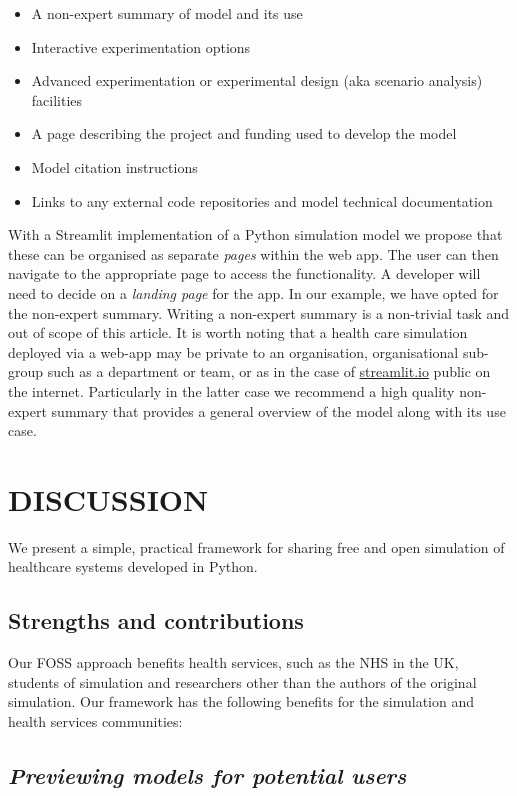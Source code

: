 \documentclass{swpaperproc}
\theoremstyle{sw}
\begin{document}
\begin{itemize}
    \item A non-expert summary of model and its use
    \item Interactive experimentation options
    \item Advanced experimentation or experimental design (aka scenario analysis) facilities
    \item A page describing the project and funding used to develop the model
    \item Model citation instructions
    \item Links to any external code repositories and model technical documentation
\end{itemize}

With a Streamlit implementation of a Python simulation model we propose that these can be organised as separate \textit{pages} within the web app.  The user can then navigate to the appropriate page to access the functionality.  A developer will need to decide on a \textit{landing page} for the app.  In our example, we have opted for the non-expert summary. Writing a non-expert summary is a non-trivial task and out of scope of this article. It is worth noting that a health care simulation deployed via a web-app may be private to an organisation, organisational sub-group such as a department or team, or as in the case of \url{streamlit.io} public on the internet. Particularly in the latter case we recommend a high quality non-expert summary that provides a general overview of the model along with its use case. 

\section{DISCUSSION}

We present a simple, practical framework for sharing free and open simulation of healthcare systems developed in Python. 

\subsection{Strengths and contributions}

Our FOSS approach benefits health services, such as the NHS in the UK, students of simulation and researchers other than the authors of the original simulation. Our framework has the following benefits for the simulation and health services communities:

\subsection*{\textit{Previewing models for potential users}}
\end{document}
